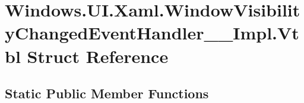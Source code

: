 \hypertarget{struct_windows_1_1_u_i_1_1_xaml_1_1_window_visibility_changed_event_handler_____impl_1_1_vtbl}{}\section{Windows.\+U\+I.\+Xaml.\+Window\+Visibility\+Changed\+Event\+Handler\+\_\+\+\_\+\+Impl.\+Vtbl Struct Reference}
\label{struct_windows_1_1_u_i_1_1_xaml_1_1_window_visibility_changed_event_handler_____impl_1_1_vtbl}
\subsection*{Static Public Member Functions}

